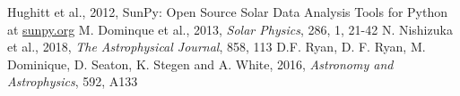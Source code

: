 \documentclass[letterpaper, 10 pt, onecolumn]{ieeeconf}
\begin{document}
\begin{thebibliography}{99}
 Hughitt et al., 2012, SunPy: Open Source Solar Data Analysis Tools for Python at \url{sunpy.org}
 M. Dominque et al., 2013, \textit{Solar Physics}, 286, 1, 21-42 
 N. Nishizuka et al., 2018, \textit{The Astrophysical Journal}, 858, 113
 D.F. Ryan, D. F. Ryan,  M. Dominique, D. Seaton, K. Stegen and A. White, 2016, \textit{Astronomy and Astrophysics}, 592, A133
\end{thebibliography}
\end{document}
